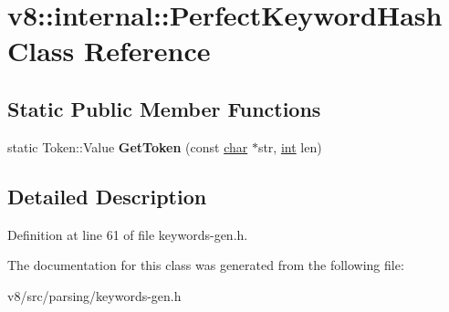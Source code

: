 \hypertarget{classv8_1_1internal_1_1PerfectKeywordHash}{}\section{v8\+:\+:internal\+:\+:Perfect\+Keyword\+Hash Class Reference}
\label{classv8_1_1internal_1_1PerfectKeywordHash}
\subsection*{Static Public Member Functions}
\begin{DoxyCompactItemize}
\item 
\mbox{\label{classv8_1_1internal_1_1PerfectKeywordHash_ab9bfd0ec49b96165b9516706449995ac}} 
static Token\+::\+Value {\bfseries Get\+Token} (const \mbox{\hyperlink{classchar}{char}} $\ast$str, \mbox{\hyperlink{classint}{int}} len)
\end{DoxyCompactItemize}


\subsection{Detailed Description}


Definition at line 61 of file keywords-\/gen.\+h.



The documentation for this class was generated from the following file\+:\begin{DoxyCompactItemize}
\item 
v8/src/parsing/keywords-\/gen.\+h\end{DoxyCompactItemize}

